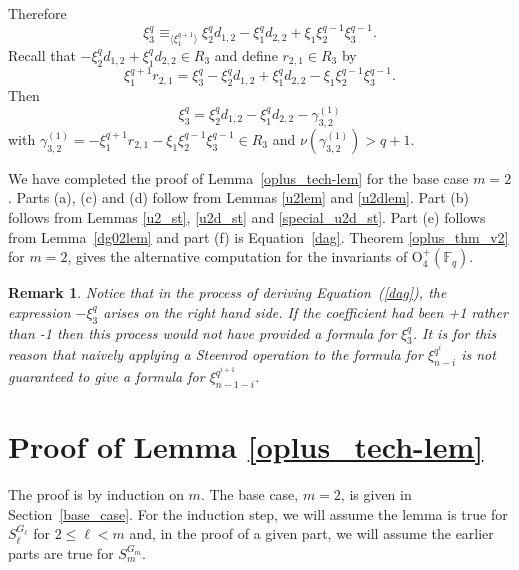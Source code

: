 \documentclass{amsart}
\newcommand{\field}{\mathbb{F}}
\newcommand{\orthp}[2]{{{\text{O}^{+}_{{#1}}(\field_{#2})}}}
\newtheorem{remark}[subsection]{Remark}
\begin{document}
 Therefore
 $$\xi_3^q\equiv_{\langle \xi_1^{q+1}\rangle} \xi_2^q d_{1,2}-\xi_1^q d_{2,2}+\xi_1\xi_2^{q-1}\xi_3^{q-1}.$$
 Recall that $- \xi_2^q d_{1,2}+\xi_1^q d_{2,2}\in R_3$ and define
 $r_{2,1}\in R_3$ by 
 \begin{equation} \label{dagger_12}
 \xi_1^{q+1}r_{2,1}=\xi_3^q- \xi_2^q d_{1,2}+\xi_1^q d_{2,2}-\xi_1\xi_2^{q-1}\xi_3^{q-1}.
 \end{equation}
Then 
\begin{equation} \label{dag}
 \xi_3^q=\xi_2^q d_{1,2}-\xi_1^q d_{2,2}-\gamma_{3,2}^{(1)}
 \end{equation}
with
$\gamma_{3,2}^{(1)}=-\xi_1^{q+1}r_{2,1}-\xi_1\xi_2^{q-1}\xi_3^{q-1}\in R_3$
and $\nu(\gamma_{3,2}^{(1)})>q+1$. 

We have completed the proof of Lemma~\ref{oplus_tech-lem} for 
the base case $m=2$.
Parts (a), (c) and (d) follow from Lemmas \ref{u2lem} and \ref{u2dlem}.
Part (b) follows from Lemmas \ref{u2_st}, \ref{u2d_st} and
\ref{special_u2d_st}. Part (e) follows from Lemma~\ref{dg02lem}
and part (f) is Equation~\ref{dag}.
Theorem \ref{oplus_thm_v2} for $m=2$, 
gives the alternative computation for the invariants of $\orthp{4}{q}$.

\begin{remark}
  Notice that in the process of deriving Equation~(\ref{dag}),
  the expression $-\xi_3^q$ arises on the right hand side.  If the coefficient 
  had been +1 rather than -1 then this process would not have provided a
  formula for $\xi_3^q$.   It is for this reason that naively applying a 
  Steenrod operation to the formula for $\xi_{n-i}^{q^i}$  
  is not guaranteed to give a formula for $\xi_{n-1-i}^{q^{i+1}}$.
\end{remark}

\section{Proof of Lemma \ref{oplus_tech-lem}}\label{proof_of_tech-lem}

The proof is by induction on $m$. 
The base case, $m=2$, is given in Section~\ref{base_case}. 
For the induction step, we will assume the lemma is true for $S_\ell^{G_\ell}$ for $2\leq\ell<m$ and, in the proof of a given part, we will assume the
earlier parts are true for $S_m^{G_m}$.
\end{document}
